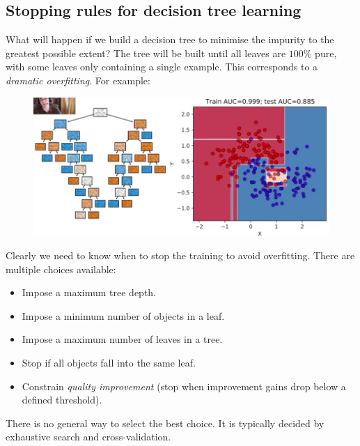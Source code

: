\newpage
\subsection{Stopping rules for decision tree learning}
What will happen if we build a decision tree to minimise the impurity to the greatest possible extent? The tree will be built until all leaves are $100$\% pure, with some leaves only containing a single example. This corresponds to a \textit{dramatic overfitting}. For example: 

\begin{figure}[H]
\centering
\includegraphics[scale=0.4]{decisiontreeoverfitting.png}
\end{figure}

Clearly we need to know when to stop the training to avoid overfitting. There are multiple choices available:
\begin{itemize}
\item Impose a maximum tree depth.
\item Impose a minimum number of objects in a leaf.
\item Impose a maximum number of leaves in a tree.
\item Stop if all objects fall into the same leaf.
\item Constrain \textit{quality improvement} (stop when improvement gains drop below a defined threshold).
\end{itemize}
There is no general way to select the best choice. It is typically decided by exhaustive search and cross-validation.

\minirule

